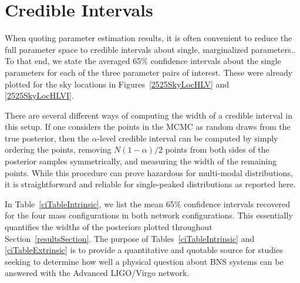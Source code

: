 \documentclass[11pt,a4paper]{emulateapj}
\newcommand{\carl}[1]{{\color{red}  #1}}
\begin{document}

\section{Credible Intervals}
\label{ciSection}

When quoting parameter estimation results, it is often convenient to reduce the full parameter space to
credible intervals about single, marginalized parameters..  To that end, we state the averaged 65\% 
confidence intervals about the single parameters for each of the three parameter pairs of interest.  These were already
 plotted for the sky locations in Figures~\ref{2525SkyLocHLV} and \ref{2525SkyLocHLVI}.  

There are several different ways of computing the width of a credible interval in this setup.  If one considers the points in
 the MCMC as random draws from the true posterior, then the $\alpha$-level credible interval can be computed by simply
  ordering the points, removing $N(1-\alpha )/2$ points from both sides of the posterior samples symmetrically, and measuring
   the width of the remaining points.  While this procedure can prove hazardous for multi-modal distributions, it is 
   straightforward and reliable for single-peaked distributions as reported here.

In Table~\ref{ciTableIntrinsic}, we list the mean 65\% confidence intervals recovered for the four mass configurations in both 
network configurations. This essentially quantifies the widths of the posteriors plotted throughout Section~\ref{resultsSection}.
  The purpose of Tables~\ref{ciTableIntrinsic} and \ref{ciTableExtrinsic} is to provide a quantitative and quotable source for studies seeking to determine how 
  well a physical question about BNS systems can be answered with the Advanced LIGO/Virgo network.
\end{document}
